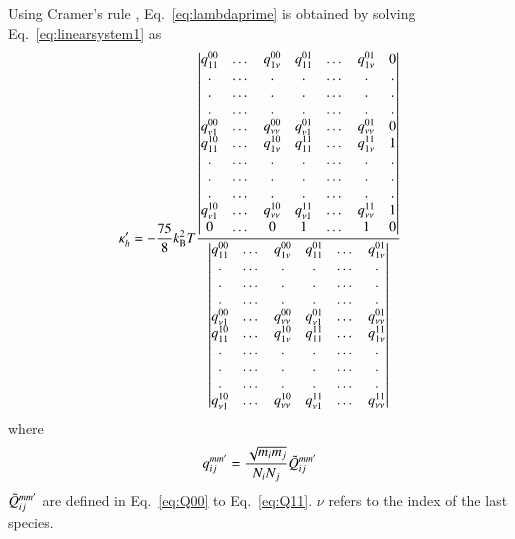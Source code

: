 \documentclass{warpdoc}
\begin{document}
Using Cramer's rule \cite{book:1964:hirschfelder}, Eq.\ \ref{eq:lambdaprime} is obtained by solving Eq.\ \ref{eq:linearsystem1} as
\begin{equation}
  \kappa_h'=-\frac{75}{8}k_{\rm B}^2 T \frac{\begin{vmatrix} 
    q_{11}^{00} & \dots & q_{1\nu}^{00} & q_{11}^{01} & \dots & q_{1 \nu}^{01} & 0\\
    . & \dots & . & . & \dots & . & .\\
    . & \dots & . & . & \dots & . & .\\
    . & \dots & . & . & \dots & . & .\\
    q_{\nu 1}^{00} & \dots & q_{\nu \nu}^{00} & q_{\nu 1}^{01} & \dots & q_{\nu \nu}^{01} & 0\\
    q_{11}^{10} & \dots & q_{1\nu}^{10} & q_{11}^{11} & \dots & q_{1 \nu}^{11} & 1\\
    . & \dots & . & . & \dots & . & .\\
    . & \dots & . & . & \dots & . & .\\
    . & \dots & . & . & \dots & . & .\\
    q_{\nu 1}^{10} & \dots & q_{\nu \nu}^{10} & q_{\nu 1}^{11} & \dots & q_{\nu \nu}^{11} & 1\\
    0 & \dots & 0 & 1 & \dots & 1 & 0\\
    \end{vmatrix}}{\begin{vmatrix} 
    q_{11}^{00} & \dots & q_{1\nu}^{00} & q_{11}^{01} & \dots & q_{1 \nu}^{01}\\
    . & \dots & . & . & \dots & .\\
    . & \dots & . & . & \dots & .\\
    . & \dots & . & . & \dots & .\\
    q_{\nu 1}^{00} & \dots & q_{\nu \nu}^{00} & q_{\nu 1}^{01} & \dots & q_{\nu \nu}^{01}\\
    q_{11}^{10} & \dots & q_{1\nu}^{10} & q_{11}^{11} & \dots & q_{1 \nu}^{11}\\
    . & \dots & . & . & \dots & .\\
    . & \dots & . & . & \dots & .\\
    . & \dots & . & . & \dots & .\\
    q_{\nu 1}^{10} & \dots & q_{\nu \nu}^{10} & q_{\nu 1}^{11} & \dots & q_{\nu \nu}^{11}\\
    \end{vmatrix}}
\end{equation}
where
\begin{equation}
  q_{ij}^{m m'}=\frac{\sqrt{m_i m_j}}{N_i N_j} \Tilde{Q}_{ij}^{m m'}
\end{equation}
$\Tilde{Q}_{ij}^{m m'}$ are defined in Eq.\ \ref{eq:Q00} to Eq.\ \ref{eq:Q11}. $\nu$ refers to the index of the last species.
\end{document}
